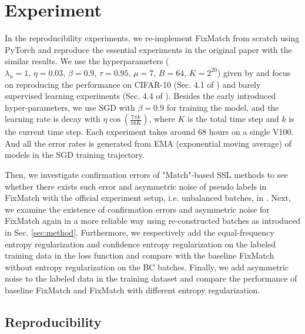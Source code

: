 \section{Experiment}
In the reproducibility experiments, we re-implement FixMatch from scratch using PyTorch and reproduce the essential experiments in the original paper with the similar results.
We use the hyperparameters 
($\lambda_u = 1,\, \eta = 0.03,\, \beta=0.9,\, \tau=0.95,\, \mu = 7,\, B = 64,\, K = 2^{20}$) 
given by \citep{sohn2020fixmatch} and focus on reproducing the performance on CIFAR-10 (Sec. 4.1 of \citep{sohn2020fixmatch}) and barely supervised learning experiments (Sec. 4.4 of \citep{sohn2020fixmatch}). Besides the early introduced hyper-parameters, we use SGD with $\beta = 0.9$ for training the model, and the learning rate is decay with $\eta \cos (\frac{7\pi k}{16 K})$, where $K$ is the total time step and $k$ is the current time step. Each experiment takes around 68 hours on a single V100. And all the error rates is generated from EMA (exponential moving average) of models in the SGD training trajectory.


Then, we investigate  confirmation errors of "Match"-based SSL methods to see whether there exists such error and asymmetric noise of pseudo labels in FixMatch with the official experiment setup, i.e. unbalanced batches, in  \citep{sohn2020fixmatch}.
Next, we examine the existence of confirmation errors and asymmetric noise for FixMatch again in a more reliable way using re-constructed batches as introduced in Sec. \ref{sec:method}. 
Furthermore, we respectively add the equal-frequency entropy regularization and confidence entropy regularization on the labeled training data in the loss function and compare with the baseline FixMatch without entropy regularization on the BC batches. Finally, we add asymmetric noise to the labeled data in the training dataset and compare the performance of baseline FixMatch and FixMatch with different entropy regularization.

\subsection{Reproducibility} \label{sec:rep}
